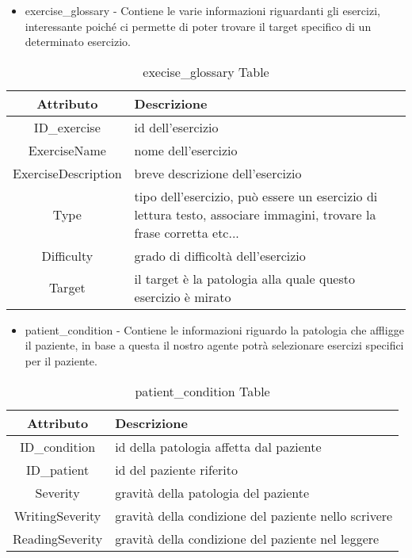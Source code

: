 \documentclass{article}
\begin{document}
\pagebreak

\begin{itemize}
\item     exercise\_glossary - Contiene le varie informazioni riguardanti gli esercizi, interessante poiché ci permette di poter trovare il target specifico di un determinato esercizio.
\end{itemize}

    \begin{table}[h]
        \centering
        \caption{execise\_glossary Table}
        \begin{tabular}{|c|p{8cm}|}
            \hline
            \textbf{Attributo} & \textbf{Descrizione} \\
            \hline
                ID\_exercise & id dell'esercizio\\
            \hline
                ExerciseName & nome dell'esercizio\\
            \hline
                ExerciseDescription & breve descrizione dell'esercizio\\
            \hline
                Type & tipo dell'esercizio, può essere un esercizio di lettura testo, associare immagini, trovare la frase corretta etc...\\
            \hline
                Difficulty & grado di difficoltà dell'esercizio\\
            \hline
                Target & il target è la patologia alla quale questo esercizio è mirato\\
            \hline
        \end{tabular}
    \end{table}

\begin{itemize}
\item     patient\_condition - Contiene le informazioni riguardo la patologia che affligge il paziente, in base a questa il nostro agente potrà selezionare esercizi specifici per il paziente.
\end{itemize}

    \begin{table}[h]
        \centering
        \caption{patient\_condition Table}
        \begin{tabular}{|c|p{8cm}|}
            \hline
            \textbf{Attributo} & \textbf{Descrizione} \\
            \hline
                ID\_condition & id della patologia affetta dal paziente\\
            \hline
                ID\_patient & id del paziente riferito\\
            \hline
                Severity & gravità della patologia del paziente \\
            \hline
                WritingSeverity & gravità della condizione del paziente nello scrivere\\
            \hline
                ReadingSeverity & gravità della condizione del paziente nel leggere\\
            \hline
        \end{tabular}
    \end{table}
\end{document}
